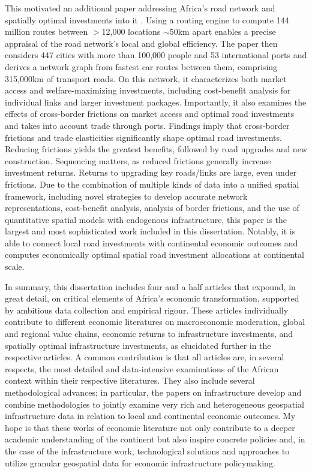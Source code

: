 \documentclass[a4paper]{article}
\begin{document}
This motivated an additional paper addressing Africa's road network and spatially optimal investments into it \citep{krantz2024optimal}. Using a routing engine to compute 144 million routes between $>$12,000 locations $\sim$50km apart enables a precise appraisal of the road network's local and global efficiency. The paper then considers 447 cities with more than 100,000 people and 53 international ports and derives a network graph from fastest car routes between them, comprising 315,000km of transport roads. On this network, it characterizes both market access and welfare-maximizing investments, including cost-benefit analysis for individual links and larger investment packages. Importantly, it also examines the effects of cross-border frictions on market access and optimal road investments and takes into account trade through ports. Findings imply that cross-border frictions and trade elasticities significantly shape optimal road investments. Reducing frictions yields the greatest benefits, followed by road upgrades and new construction. Sequencing matters, as reduced frictions generally increase investment returns. Returns to upgrading key roads/links are large, even under frictions. Due to the combination of multiple kinds of data into a unified spatial framework, including novel strategies to develop accurate network representations, cost-benefit analysis, analysis of border frictions, and the use of quantitative spatial models with endogenous infrastructure, this paper is the largest and most sophisticated work included in this dissertation. Notably, it is able to connect local road investments with continental economic outcomes and computes economically optimal spatial road investment allocations at continental scale. \newline

In summary, this dissertation includes four and a half articles that expound, in great detail, on critical elements of Africa's economic transformation, supported by ambitious data collection and empirical rigour. These articles individually contribute to different economic literatures on macroeconomic moderation, global and regional value chains, economic returns to infrastructure investments, and spatially optimal infrastructure investments, as elucidated further in the respective articles. A common contribution is that all articles are, in several respects, the most detailed and data-intensive examinations of the African context within their respective literatures. They also include several methodological advances; in particular, the papers on infrastructure develop and combine methodologies to jointly examine very rich and heterogeneous geospatial infrastructure data in relation to local and continental economic outcomes. My hope is that these works of economic literature not only contribute to a deeper academic understanding of the continent but also inspire concrete policies and, in the case of the infrastructure work, technological solutions and approaches to utilize granular geospatial data for economic infrastructure policymaking. 

\newpage


\end{document}
